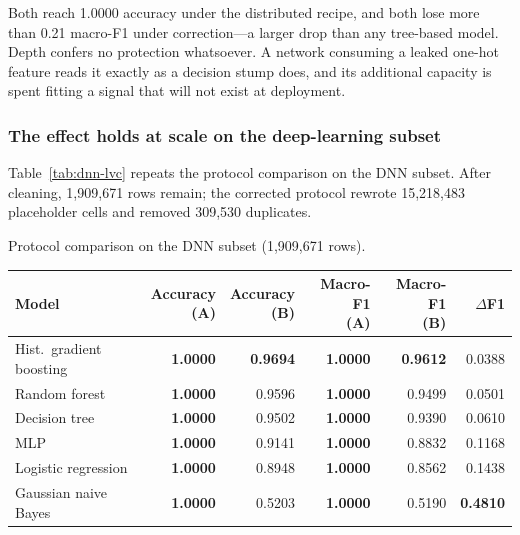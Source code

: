 Both reach 1.0000 accuracy under the distributed recipe, and both lose more
than 0.21 macro-F1 under correction---a larger drop than any tree-based model.
Depth confers no protection whatsoever. A network consuming a leaked one-hot
feature reads it exactly as a decision stump does, and its additional capacity
is spent fitting a signal that will not exist at deployment.

\subsubsection{The effect holds at scale on the deep-learning subset}

Table~\ref{tab:dnn-lvc} repeats the protocol comparison on the DNN subset.
After cleaning, 1{,}909{,}671 rows remain; the corrected protocol rewrote
15{,}218{,}483 placeholder cells and removed 309{,}530 duplicates.

\begin{wtable}
\centering
\footnotesize
\caption{Protocol comparison on the DNN subset (1{,}909{,}671 rows).}
\label{tab:dnn-lvc}
\begin{fittable}
\begin{tabular}{lrrrrr}
\toprule
Model & \makecell{Accuracy\\(A)} & \makecell{Accuracy\\(B)} & \makecell{Macro-F1\\(A)} & \makecell{Macro-F1\\(B)} & $\Delta$F1 \\
\midrule
Hist.\ gradient boosting & \textbf{1.0000} & \textbf{0.9694} & \textbf{1.0000} & \textbf{0.9612} & 0.0388 \\
Random forest            & \textbf{1.0000} & 0.9596 & \textbf{1.0000} & 0.9499 & 0.0501 \\
Decision tree            & \textbf{1.0000} & 0.9502 & \textbf{1.0000} & 0.9390 & 0.0610 \\
MLP                      & \textbf{1.0000} & 0.9141 & \textbf{1.0000} & 0.8832 & 0.1168 \\
Logistic regression      & \textbf{1.0000} & 0.8948 & \textbf{1.0000} & 0.8562 & 0.1438 \\
Gaussian naive Bayes     & \textbf{1.0000} & 0.5203 & \textbf{1.0000} & 0.5190 & \textbf{0.4810} \\
\bottomrule
\end{tabular}
\end{fittable}
\end{wtable}

